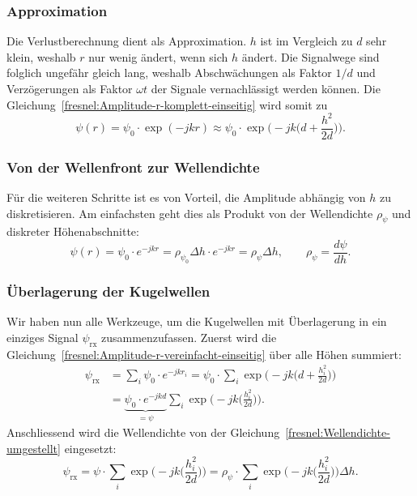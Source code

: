 \subsubsection{Approximation}
Die Verlustberechnung dient als Approximation.
$h$ ist im Vergleich zu $d$ sehr klein,
weshalb $r$ nur wenig ändert,
wenn sich $h$ ändert.
Die Signalwege sind folglich ungefähr gleich lang, 
weshalb Abschwächungen als Faktor $1/d$ und Verzögerungen als Faktor $\omega t$ der Signale 
vernachlässigt werden können.
Die Gleichung~\eqref{fresnel:Amplitude-r-komplett-einseitig}
wird somit zu
\begin{equation}
    \psi(r)
    =
    \psi_0 \cdot \exp\left(-jkr\right)
    \approx
    \psi_0 \cdot \exp\biggl(-jk\biggl(d+\frac{h^2}{2d}\biggr)\biggr).
    \label{fresnel:Amplitude-r-vereinfacht-einseitig}
\end{equation}

\subsubsection{Von der Wellenfront zur Wellendichte}
Für die weiteren Schritte ist es von Vorteil,
die Amplitude abhängig von $h$ zu diskretisieren.
Am einfachsten geht dies als Produkt von der Wellendichte
$\rho_{\psi}$ und diskreter Höhenabschnitte:
\begin{equation}
    \psi(r)
    =
    \psi_0 \cdot e^{-jkr}
    =
    \rho_{\psi_0}\Delta h \cdot e^{-jkr}
    =
    \rho_{\psi }\Delta h,
    \qquad
    \rho_{\psi}
    =
    \frac{d\psi}{dh}.
    \label{fresnel:Wellendichte-umgestellt}
\end{equation}

\subsubsection{Überlagerung der Kugelwellen} %
Wir haben nun alle Werkzeuge, 
um die Kugelwellen mit Überlagerung
in ein einziges Signal $\psi_{\text{rx}}$ zusammenzufassen.
Zuerst wird die Gleichung~\eqref{fresnel:Amplitude-r-vereinfacht-einseitig}
über alle Höhen summiert:
\begin{subequations}
\label{fresnel:Kugelwellen-wellendichte-summiert}
    \begin{align}
        \psi_{\text{rx}}
        &=
        \sum_i \psi_0 \cdot e^{-jkr_i}
        =
        \psi_0 \cdot \sum_i \exp\biggl(-jk\biggl(d+\frac{h^2_i}{2d}\biggr)\biggr)\\
        &=
        \underbrace{\psi_0 \cdot e^{-jkd}}_{\displaystyle=\psi}
	\sum_i \exp\biggl(-jk\biggl(\frac{h^2_i}{2d}\biggr)\biggr).
    \end{align}
\end{subequations}
Anschliessend wird die Wellendichte von der Gleichung~\eqref{fresnel:Wellendichte-umgestellt}
eingesetzt:
\begin{equation}
    \psi_{\text{rx}}
    =
    \psi \cdot \sum_i \exp\biggl(-jk\biggl(\frac{h^2_i}{2d}\biggr)\biggr)
    =
    \rho_{\psi} \cdot \sum_i \exp\biggl(-jk\biggl(\frac{h^2_i}{2d}\biggr)\biggr) \Delta h.
    \label{fresnel:Kugelwellen-wellendichte-superpos}
\end{equation}

